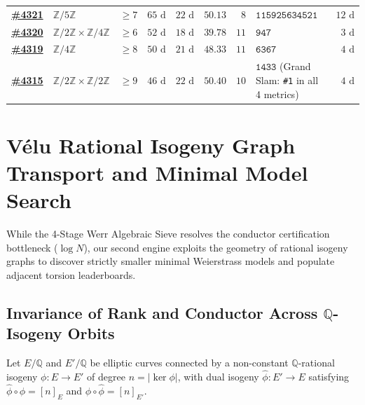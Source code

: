 \documentclass[10pt,a4paper]{article}
\theoremstyle{plain}
\theoremstyle{definition}
\theoremstyle{remark}
\begin{document}
\begin{table}[htbp]
\begin{tabular}{llrrrrrlr}
\href{https://elliptic-rank.icarm.cloud/curve/4321}{\textbf{\#4321}} & $\mathbb{Z}/5\mathbb{Z}$ & $\ge 7$ & $65\text{ d}$ & $22\text{ d}$ & $50.13$ & $8$ & $\texttt{115925634521}$ & $12\text{ d}$ \\
\href{https://elliptic-rank.icarm.cloud/curve/4320}{\textbf{\#4320}} & $\mathbb{Z}/2\mathbb{Z} \times \mathbb{Z}/4\mathbb{Z}$ & $\ge 6$ & $52\text{ d}$ & $18\text{ d}$ & $39.78$ & $11$ & $\texttt{947}$ & $3\text{ d}$ \\
\href{https://elliptic-rank.icarm.cloud/curve/4319}{\textbf{\#4319}} & $\mathbb{Z}/4\mathbb{Z}$ & $\ge 8$ & $50\text{ d}$ & $21\text{ d}$ & $48.33$ & $11$ & $\texttt{6367}$ & $4\text{ d}$ \\
\href{https://elliptic-rank.icarm.cloud/curve/4315}{\textbf{\#4315}} & $\mathbb{Z}/2\mathbb{Z} \times \mathbb{Z}/2\mathbb{Z}$ & $\ge 9$ & $46\text{ d}$ & $22\text{ d}$ & $50.40$ & $10$ & $\texttt{1433}$ (Grand Slam: \texttt{\#1} in all 4 metrics) & $4\text{ d}$ \\
\bottomrule
\end{tabular}
\end{table}

\section{\texorpdfstring{V\'{e}lu Rational Isogeny Graph Transport and Minimal Model Search}{Velu Rational Isogeny Graph Transport and Minimal Model Search}}\label{sec:velu_engine}

While the 4-Stage Werr Algebraic Sieve resolves the conductor certification bottleneck ($\log N$), our second engine exploits the geometry of rational isogeny graphs to discover strictly smaller minimal Weierstrass models and populate adjacent torsion leaderboards.

\subsection{\texorpdfstring{Invariance of Rank and Conductor Across $\mathbb{Q}$-Isogeny Orbits}{Invariance of Rank and Conductor Across Q-Isogeny Orbits}}

Let $E/\mathbb{Q}$ and $E'/\mathbb{Q}$ be elliptic curves connected by a non-constant $\mathbb{Q}$-rational isogeny $\phi: E \to E'$ of degree $n = |\ker \phi|$, with dual isogeny $\hat{\phi}: E' \to E$ satisfying $\hat{\phi} \circ \phi = [n]_E$ and $\phi \circ \hat{\phi} = [n]_{E'}$.
\end{document}
